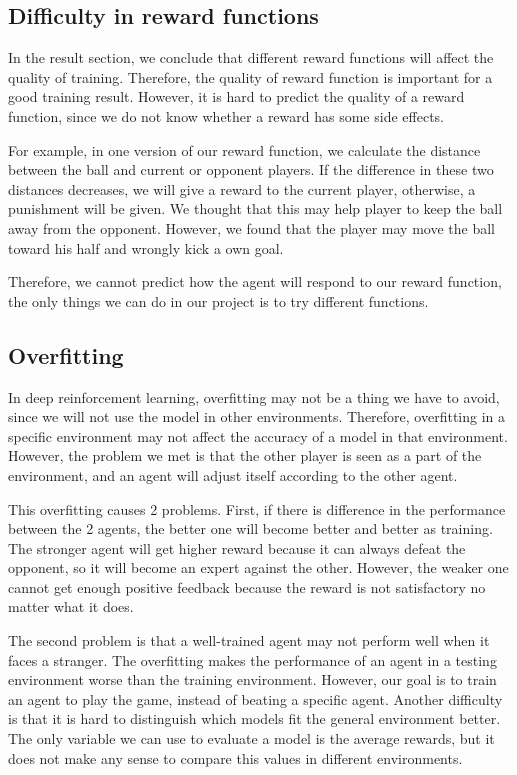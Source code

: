 \documentclass[12pt]{article}
\begin{document}
\subsection{Difficulty in reward functions}

In the result section, we conclude that different reward functions will affect the quality of training. Therefore, the quality of reward function is important for a good training result. However, it is hard to predict the quality of a reward function, since we do not know whether a reward has some side effects. 

For example, in one version of our reward function, we calculate the distance between the ball and current or opponent players. If the difference in these two distances decreases, we will give a reward to the current player, otherwise, a punishment will be given. We thought that this may help player to keep the ball away from the opponent. However, we found that the player may move the ball toward his half and wrongly kick a own goal.

Therefore, we cannot predict how the agent will respond to our reward function, the only things we can do in our project is to try different functions.

\subsection{Overfitting}

In deep reinforcement learning, overfitting may not be a thing we have to avoid, since we will not use the model in other environments. Therefore, overfitting in a specific environment may not affect the accuracy of a model in that environment. However, the problem we met is that the other player is seen as a part of the environment, and an agent will adjust itself according to the other agent.

This overfitting causes 2 problems. First, if there is difference in the performance between the 2 agents, the better one will become better and better as training. The stronger agent will get higher reward because it can always defeat the opponent, so it will become an expert against the other. However, the weaker one cannot get enough positive feedback because the reward is not satisfactory no matter what it does.

The second problem is that a well-trained agent may not perform well when it faces a stranger. The overfitting makes the performance of an agent in a testing environment worse than the training environment. However, our goal is to train an agent to play the game, instead of beating a specific agent. Another difficulty is that it is hard to distinguish which models fit the general environment better. The only variable we can use to evaluate a model is the average rewards, but it does not make any sense to compare this values in different environments.
\end{document}
